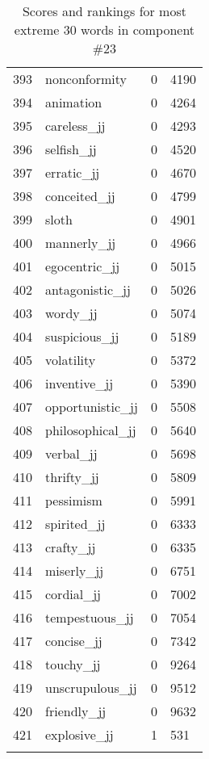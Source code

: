\begin{longtable}[!htbp]{| rlr@{.}l |}
    393 & nonconformity & 0 & 4190 \\
    394 & animation & 0 & 4264 \\
    395 & careless\_jj & 0 & 4293 \\
    396 & selfish\_jj & 0 & 4520 \\
    397 & erratic\_jj & 0 & 4670 \\
    398 & conceited\_jj & 0 & 4799 \\
    399 & sloth & 0 & 4901 \\
    400 & mannerly\_jj & 0 & 4966 \\
    401 & egocentric\_jj & 0 & 5015 \\
    402 & antagonistic\_jj & 0 & 5026 \\
    403 & wordy\_jj & 0 & 5074 \\
    404 & suspicious\_jj & 0 & 5189 \\
    405 & volatility & 0 & 5372 \\
    406 & inventive\_jj & 0 & 5390 \\
    407 & opportunistic\_jj & 0 & 5508 \\
    408 & philosophical\_jj & 0 & 5640 \\
    409 & verbal\_jj & 0 & 5698 \\
    410 & thrifty\_jj & 0 & 5809 \\
    411 & pessimism & 0 & 5991 \\
    412 & spirited\_jj & 0 & 6333 \\
    413 & crafty\_jj & 0 & 6335 \\
    414 & miserly\_jj & 0 & 6751 \\
    415 & cordial\_jj & 0 & 7002 \\
    416 & tempestuous\_jj & 0 & 7054 \\
    417 & concise\_jj & 0 & 7342 \\
    418 & touchy\_jj & 0 & 9264 \\
    419 & unscrupulous\_jj & 0 & 9512 \\
    420 & friendly\_jj & 0 & 9632 \\
    421 & explosive\_jj & 1 & 531 \\
    \hline
    \caption{Scores and rankings for most extreme 30 words in component \#23} \\
\end{longtable}
